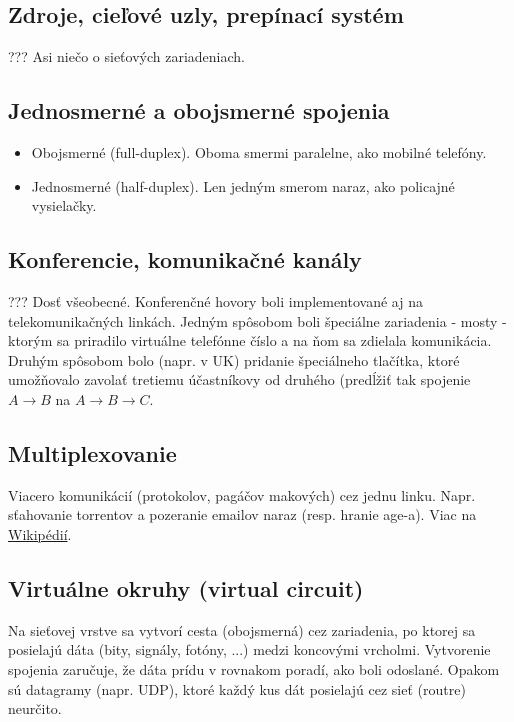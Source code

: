 \documentclass[10pt,a4paper]{article}
\begin{document}
\subsection{Zdroje, cieľové uzly, prepínací systém}
???
Asi niečo o sieťových zariadeniach. 
 
\subsection{Jednosmerné a obojsmerné spojenia}
       
\begin{itemize}                                  
\item Obojsmerné (full-duplex). Oboma smermi paralelne, ako mobilné telefóny.
\item Jednosmerné (half-duplex). Len jedným smerom naraz, ako policajné vysielačky.
\end{itemize} 
     
\subsection{Konferencie, komunikačné kanály}  
???
Dosť všeobecné. 
Konferenčné hovory boli implementované aj na telekomunikačných linkách. Jedným spôsobom boli špeciálne zariadenia - mosty - ktorým sa priradilo virtuálne telefónne číslo a na ňom sa zdielala komunikácia. Druhým spôsobom bolo (napr. v UK) pridanie špeciálneho tlačítka, ktoré umožňovalo zavolať tretiemu účastníkovy od druhého (predĺžiť tak spojenie $A \rightarrow B$ na $A \rightarrow B \rightarrow C$. 
  
\subsection{Multiplexovanie}   
\label{multiplexing}
Viacero komunikácií (protokolov, pagáčov makových) cez jednu linku. 
Napr. sťahovanie torrentov a pozeranie emailov naraz (resp. hranie age-a). 
Viac na \href{http://en.wikipedia.org/wiki/Multiplexing}{Wikipédií}.
       
\subsection{Virtuálne okruhy (virtual circuit)}     
Na sieťovej vrstve sa vytvorí cesta (obojsmerná) cez zariadenia, po ktorej sa posielajú dáta (bity, signály, fotóny, ...) medzi koncovými vrcholmi. Vytvorenie spojenia zaručuje, že dáta prídu v rovnakom poradí, ako boli odoslané. Opakom sú datagramy (napr. UDP), ktoré každý kus dát posielajú cez sieť (routre) neurčito.   
    
\end{document}
